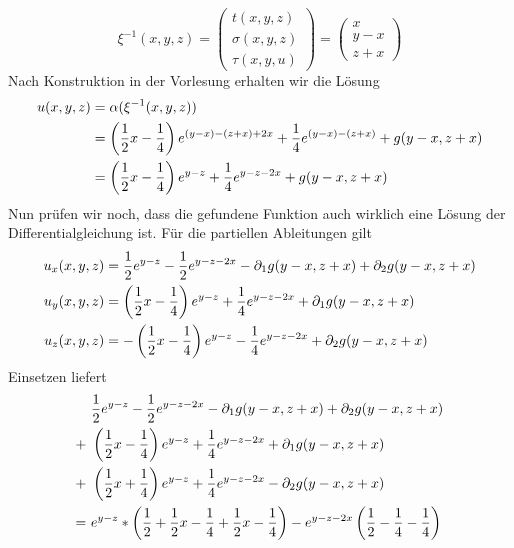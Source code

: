 \begin{exercisePage}[Charakteristikenmethode]
\begin{enumerate}[label=(zu \alph*), leftmargin=*]
\begin{equation*}
			\xi^{-1}(x,y,z) =
			\begin{pmatrix}
				t(x,y,z) \\ \sigma(x,y,z) \\ \tau(x,y,u) 
			\end{pmatrix}
			=
			\begin{pmatrix}
				x \\ y-x \\ z+x
			\end{pmatrix}
		\end{equation*}
		Nach Konstruktion in der Vorlesung erhalten wir die Lösung
		\begin{equation*}
			\begin{aligned}
				u(x,y,z) 
				&= \alpha(\xi^{-1}(x,y,z)) \\
				&= \left( \frac{1}{2} x - \frac{1}{4} \right) e^{(y-x) - (z+x) + 2x} + \frac{1}{4} e^{(y-x)-(z+x)} + g(y-x, z+x) \\
				&= \left( \frac{1}{2} x - \frac{1}{4} \right) e^{y-z} + \frac{1}{4} e^{y- z -2x} + g(y-x, z+x) 
			\end{aligned} 
		\end{equation*}
		Nun prüfen wir noch, dass die gefundene Funktion auch wirklich eine Lösung der Differentialgleichung ist. Für die partiellen Ableitungen gilt
		\begin{equation*}
			\begin{aligned}
				u_x(x,y,z) &= \frac{1}{2}e^{y-z} - \frac{1}{2} e^{y-z-2x}  - \partial_1 g(y-x, z+x) + \partial_2 g(y-x, z+x) \\
				u_y(x,y,z) &= \left( \frac{1}{2}x - \frac{1}{4} \right)e^{y-z} + \frac{1}{4} e^{y-z-2x} + \partial_1 g(y-x, z+x) \\
				u_z(x,y,z) &= - \left( \frac{1}{2}x - \frac{1}{4} \right)e^{y-z} - \frac{1}{4} e^{y-z-2x} + \partial_2 g(y-x, z+x)
			\end{aligned}
		\end{equation*}
		Einsetzen liefert
		\begin{equation*}
			\begin{aligned}
				& \frac{1}{2}e^{y-z} - \frac{1}{2} e^{y-z-2x}  - \partial_1 g(y-x, z+x) + \partial_2 g(y-x, z+x) \\
				+ \ &
				\brackets{\frac{1}{2}x - \frac{1}{4}}e^{y-z} + \frac{1}{4} e^{y-z-2x} + \partial_1 g(y-x, z+x) \\
				+ \ &
				\brackets{\frac{1}{2}x + \frac{1}{4}}e^{y-z} + \frac{1}{4} e^{y-z-2x} - \partial_2 g(y-x, z+x) \\
				= \ &
				e^{y-z} * \brackets{\frac{1}{2} + \frac{1}{2}x - \frac{1}{4} + \frac{1}{2}x - \frac{1}{4}}  - e^{y-z-2x} \brackets{\frac{1}{2} - \frac{1}{4} - \frac{1}{4} } \\

\end{aligned}
\end{equation*}
\end{enumerate}
\end{exercisePage}
